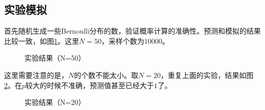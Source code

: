 \documentclass[12pt,a4paper]{article}
\begin{document}
\subsection*{实验模拟}

首先随机生成一些Bernoulli分布的数，验证概率计算的准确性。预测和模拟的结果比较一致，如图\ref{qk}。这里$N=50$，采样个数为$10000$。
\begin{figure}[h]
\centering
{}
\caption{实验结果（N=50）}
\label{qk}
\end{figure}

这里需要注意的是，$N$的个数不能太小。取$N=20$，重复上面的实验，结果如图\ref{20qk}。在$p$较大的时候不准确，预测值甚至已经大于$1$了。
\begin{figure}[h]
\centering
{}
\caption{实验结果（N=20）}
\label{20qk}
\end{figure}
\end{document}
